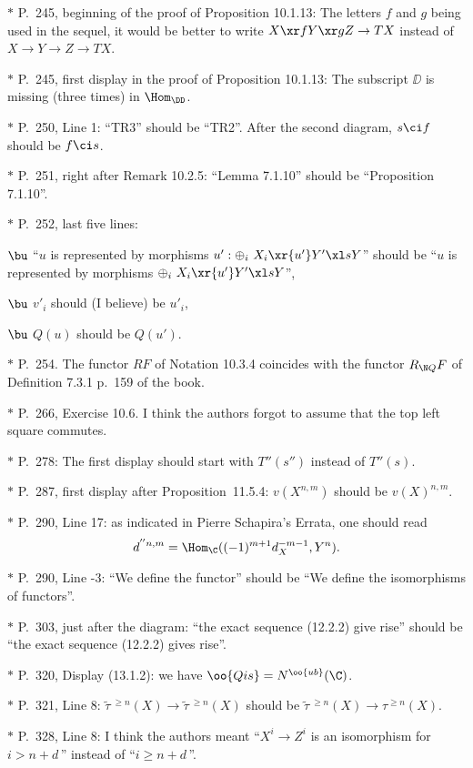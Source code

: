\documentclass[12pt]{article}
\theoremstyle{remark}
\theoremstyle{definition}
\begin{document}
\nn$*$ P.~245, beginning of the proof of Proposition 10.1.13: The letters $f$ and $g$ being used in the sequel, it would be better to write $X\xr fY\xr gZ\to TX$ instead of $X\to Y\to Z\to TX$. 

\nn$*$ P.~245, first display in the proof of Proposition 10.1.13: The subscript $\DD$ is missing (three times) in $\Hom_\DD$.

\nn$*$ P.~250, Line 1: ``TR3'' should be ``TR2''. After the second diagram, $s\ci f$ should be $f\ci s$.

\nn$*$ P.~251, right after Remark 10.2.5: ``Lemma 7.1.10'' should be ``Proposition 7.1.10''.

\nn$*$ P.~252, last five lines:

$\bu$ ``$u$ is represented by morphisms $u':\oplus_i\ X_i\xr{u'}Y'\xl sY$'' should be ``$u$ is represented by morphisms $\oplus_i\ X_i\xr{u'}Y'\xl sY$'',

$\bu$ $v'_i$ should (I believe) be $u'_i$,

$\bu$ $Q(u)$ should be $Q(u')$.

\nn$*$ P.~254. The functor $RF$ of Notation 10.3.4 coincides with the functor $R_{\N Q}F$ of Definition 7.3.1 p.~159 of the book.

\nn$*$ P.~266, Exercise 10.6. I think the authors forgot to assume that the top left square commutes.

\nn$*$ P.~278: The first display should start with $T''(s'')$ instead of $T''(s)$.

\nn$*$ P.~287, first display after Proposition~11.5.4: $v(X^{n,m})$ should be $v(X)^{n,m}$.

\begin{s}
\nn$*$ P.~290, Line 17: as indicated in Pierre Schapira's Errata, one should read 
$$
d^{''n,m}=\Hom_\C((-1)^{m+1}d_X^{-m-1},Y^n).
$$
\end{s}

\nn$*$ P.~290, Line -3: ``We define the functor'' should be ``We define the isomorphisms of functors''.

\nn$*$ P.~303, just after the diagram: ``the exact sequence (12.2.2) give rise'' should be ``the exact sequence (12.2.2) gives rise''.

\nn$*$ P.~320, Display (13.1.2): we have $\oo{Qis}=N^{\oo{ub}}(\C)$.

\nn$*$ P.~321, Line 8: $\widetilde\tau\,{}^{\ge n}(X)\to\widetilde\tau\,{}^{\ge n}(X)$ should be $\widetilde\tau\,{}^{\ge n}(X)\to\tau^{\ge n}(X)$.

\nn$*$ P.~328, Line 8: I think the authors meant ``$X^i\to Z^i$ is an isomorphism for $i>n+d\,$'' instead of ``$i\ge n+d\,$''.
\end{document}

